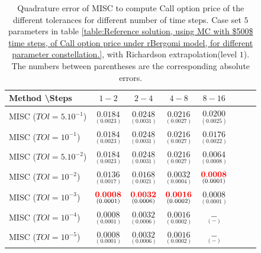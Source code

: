 \documentclass[11pt]{article}
\begin{document}
\begin{table}[h!]
	\centering
	\begin{tabular}{l*{6}{c}r}
		Method \textbackslash  Steps            & $1-2$ & $2-4$ & $4-8$ & $8-16$  \\
		\hline
		MISC ($TOl=5.10^{-1}$)  & $\underset{(0.0023)}{\mathbf{    0.0184
		}}$  & $\underset{( 0.0031)}{\mathbf{ 0.0248}}$  & $\underset{(   0.0027)}{\mathbf{  0.0216}}$  & $\underset{(
	0.0025
)}{\mathbf{  0.0200}}$  \\ 
		MISC ($TOl=10^{-1}$) & $\underset{(0.0023)}{\mathbf{    0.0184
		}}$  & $\underset{( 0.0031)}{\mathbf{ 0.0248}}$   & $\underset{(   0.0027)}{\mathbf{  0.0216}}$ & $\underset{(  0.0022)}{\mathbf{  0.0176}}$  \\ 
		MISC ($TOl=5.10^{-2}$)  &  $\underset{(0.0023)}{\mathbf{    0.0184
		}}$ & $\underset{( 0.0031)}{\mathbf{ 0.0248}}$   & $\underset{(   0.0027)}{\mathbf{  0.0216}}$  & $\underset{(  0.0008)}{\mathbf{  
		0.0064}}$  \\ 
		MISC ($TOl=10^{-2}$)   & $\underset{(    0.0017
			)}{\mathbf{  0.0136}}$  & $\underset{(
			0.0021)}{\mathbf{   0.0168}}$  & $\underset{(0.0004)}{\mathbf{   0.0032
		}}$  & $\underset{(0.0001)}{\mathbf{{\color{red}0.0008}}}$  \\ 
		MISC ($TOl=10^{-3}$)  & $\underset{(0.0001)}{\mathbf{{\color{red}0.0008}}}$  & $\underset{(0.0006)}{\mathbf{  {\color{red}0.0032}}}$   & $\underset{(0.0002)}{\mathbf{    {\color{red}0.0016}}}$  &  $\underset{(0.0001)}{\mathbf{0.0008}}$  \\ 
		
		MISC ($TOl=10^{-4}$)  & $\underset{(0.0001)}{\mathbf{0.0008}}$  & $\underset{(0.0006)}{\mathbf{ 0.0032}}$   & $\underset{(0.0002)}{\mathbf{   0.0016}}$ & $\underset{(-)}{\mathbf{-}}$  \\

				MISC ($TOl=10^{-5}$)    &  $\underset{(0.0001)}{\mathbf{0.0008}}$ & $\underset{(0.0006)}{\mathbf{  0.0032}}$   & $\underset{(0.0002)}{\mathbf{    0.0016}}$ & $\underset{(-)}{\mathbf{-}}$  \\
		
		\hline
	\end{tabular}
	\caption{Quadrature error of MISC to compute Call option price of the different tolerances for different number of time steps. Case set $5$ parameters in table \ref{table:Reference solution, using MC with $500$ time steps, of Call option price under rBergomi model, for different parameter constellation.}, with Richardson extrapolation(level $1$). The numbers between parentheses are the corresponding absolute errors.}
	\label{Quadrature error of MISC to compute Call option price of the different tolerances for different number of time steps. Case set $5$ parameters, with Richardson extrapolation(level $1$). The numbers between parentheses are the corresponding absolute errors.}
\end{table}
\end{document}
